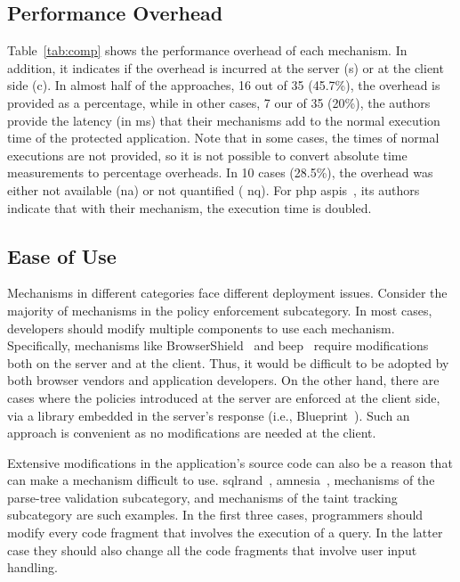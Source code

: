 \documentclass[10pt,journal,compsoc]{IEEEtran}
\begin{document}
\subsection{Performance Overhead}

Table~\ref{tab:comp} shows the performance overhead of each mechanism.
In addition, it indicates if the overhead is incurred at the
server ({\sc s}) or at the client side ({\sc c}). In almost half of
the approaches, 16 out of 35 (45.7\%), the overhead is provided as a
percentage, while in other cases, 7 our of 35 (20\%), the authors
provide the latency (in ms) that their mechanisms add to the
normal execution time of the protected application. Note that in some
cases, the times of normal executions are not provided,
so it is not possible to convert absolute
time measurements to percentage overheads. In 10 cases (28.5\%), the
overhead was either not available ({\sc na}) or not quantified ({\sc
  nq}). For {\sc php aspis}~\cite{PMP11}, its authors indicate that with
their mechanism, the execution time is doubled.

\subsection{Ease of Use}
\label{sec:deploy2}

Mechanisms in different categories face different deployment issues.
Consider the majority of mechanisms in the policy enforcement
subcategory. In most cases, developers should modify multiple
components to use each mechanism. Specifically, mechanisms like
BrowserShield~\cite{RDWDE07} and {\sc beep}~\cite{TNH07}
require modifications both on the server
and at the client. Thus, it would be difficult to be
adopted by both browser vendors and application developers. On the
other hand, there are cases where the policies introduced at the
server are enforced at the client side, via a library embedded in the
server's response (i.e., Blueprint~\cite{LV09}).
Such an approach is convenient
as no modifications are needed at the client.

Extensive modifications in the application's source
code can also be a reason that can make a mechanism
difficult to use. {\sc sql}rand~\cite{BK04},
{\sc amnesia}~\cite{HO06},
mechanisms of the parse-tree validation
subcategory, and mechanisms of the taint
tracking subcategory are such examples.
In the first three cases, programmers should modify every
code fragment that involves the execution of a query.
In the latter case they should also change
all the code fragments that involve user input handling. 
\end{document}
